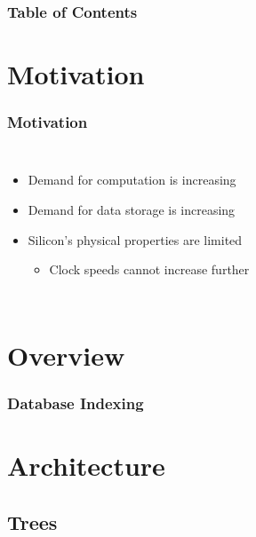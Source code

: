 \documentclass{beamer}
\title{}
\author{Clarity Shimoniak}
\institute[UCR]{University of California, Riverside}
\date{2025}
\begin{document}
\frame{\titlepage}

\begin{frame}
	\frametitle{Table of Contents}
	\tableofcontents
\end{frame}


\section{Motivation}

\begin{frame}
	\frametitle{Motivation}
	
	\begin{columns}[onlytextwidth,T]
		\begin{itemize}
			\item Demand for computation is increasing
			\item Demand for data storage is increasing
			\item Silicon's physical properties are limited
			\begin{itemize}
				\item Clock speeds cannot increase further
			\end{itemize}
		\end{itemize}

		\begin{figure}
			\centering
			
		\end{figure}
	\end{columns}
\end{frame}


\section{Overview}

\begin{frame}
	\frametitle{Database Indexing}
\end{frame}


\section{Architecture}

\begin{frame}
	\frametitle{}
\end{frame}


\subsection{Trees}
\end{document}
